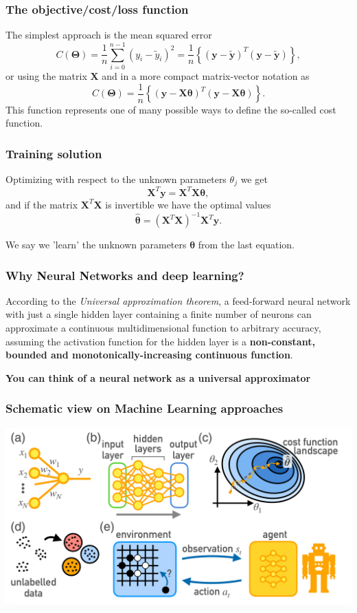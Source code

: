 \documentclass{beamer}
\begin{document}
\begin{frame}
\frametitle{The objective/cost/loss function}

The  simplest approach is the mean squared error
\[
C(\bm{\Theta})=\frac{1}{n}\sum_{i=0}^{n-1}\left(y_i-\tilde{y}_i\right)^2=\frac{1}{n}\left\{\left(\bm{y}-\bm{\tilde{y}}\right)^T\left(\bm{y}-\bm{\tilde{y}}\right)\right\},
\]
or using the matrix $\bm{X}$ and in a more compact matrix-vector notation as
\[
C(\bm{\Theta})=\frac{1}{n}\left\{\left(\bm{y}-\bm{X}\bm{\theta}\right)^T\left(\bm{y}-\bm{X}\bm{\theta}\right)\right\}.
\]
This function represents one of many possible ways to define the so-called cost function.
\end{frame}

\begin{frame}
\frametitle{Training solution}

Optimizing with respect to the unknown parameters $\theta_j$ we get 
\[
\bm{X}^T\bm{y} = \bm{X}^T\bm{X}\bm{\theta},  
\]
and if the matrix $\bm{X}^T\bm{X}$ is invertible we have the optimal values
\[
\hat{\bm{\theta}} =\left(\bm{X}^T\bm{X}\right)^{-1}\bm{X}^T\bm{y}.
\]

We say we 'learn' the unknown parameters $\bm{\theta}$ from the last equation.
\end{frame}


\begin{frame}
\frametitle{Why Neural Networks and deep learning?}
\begin{block}{}
According to the \emph{Universal approximation theorem}, a feed-forward
neural network with just a single hidden layer containing a finite
number of neurons can approximate a continuous multidimensional
function to arbitrary accuracy, assuming the activation function for
the hidden layer is a \textbf{non-constant, bounded and
monotonically-increasing continuous function}.
\end{block}
\begin{block}{}
\textbf{You can think of a neural network as a universal approximator}
\end{block}
\end{frame}


\begin{frame}
\frametitle{Schematic view on Machine Learning approaches}


\centerline{\includegraphics[width=1.05\linewidth]{figures/krenn2}}

\end{frame}
\end{document}
